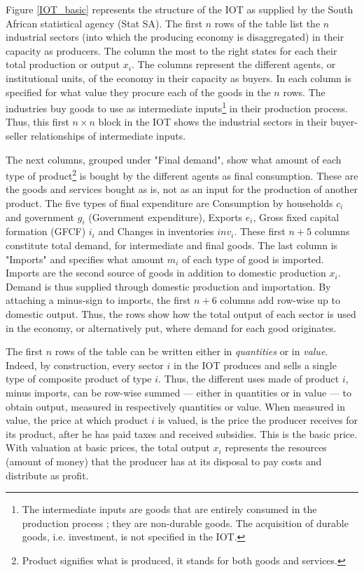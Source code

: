 \documentclass[12pt,english]{article}
\begin{document}
Figure \ref{IOT_basic} represents the structure of the IOT as supplied by the South African statistical agency (Stat SA). The first $n$ rows of the table list the $n$ industrial sectors (into which the producing economy is disaggregated) in their capacity as producers. The column the most to the right states for each their total production or output $x_i$. 
The columns represent the different agents, or institutional units, of the economy in their capacity as buyers. In each column is specified for what value they procure each of the goods in the $n$ rows. %
The industries buy goods to use as intermediate inputs\footnote{The intermediate inputs are goods that are entirely consumed in the production process ; they are non-durable goods. The acquisition of durable goods, i.e. investment, is not specified in the IOT.} in their production process. Thus, this first $n \times n$ block in the IOT shows the industrial sectors in their buyer-seller relationships of intermediate inputs. 

The next columns, grouped under "Final demand", show what amount of each type of product\footnote{Product signifies what is produced, it stands for both goods and services.} is bought by the different agents as final consumption. These are the goods and services bought as is, not as an input for the production of another product. The five types of final expenditure are Consumption by households $c_i$ and government $g_i$ (Government expenditure), Exports $e_i$, Gross fixed capital formation (GFCF) $i_i$ and Changes in inventories $inv_i$. These first $n+5$ columns constitute total demand, for intermediate and final goods. The last column is "Imports" and specifies what amount $m_i$ of each type of good is imported. Imports are the second source of goods in addition to domestic production $x_i$. Demand is thus supplied through domestic production and importation. By attaching a minus-sign to imports, the first $n+6$ columns add row-wise up to domestic output. Thus, the rows show how the total output of each sector is used in the economy, or alternatively put, where demand for each good originates.

The first $n$ rows of the table can be written either in \emph{quantities} or in \emph{value}. Indeed, by construction, every sector $i$ in the IOT produces and sells a single type of composite product of type $i$. Thus, the different uses made of product $i$, minus imports, can be row-wise summed --- either in quantities or in value --- to obtain output, measured in respectively quantities or value. When measured in value, the price at which product $i$ is valued, is the price the producer receives for its product, after he has paid taxes and received subsidies. This is the basic price. %
With valuation at basic prices, the total output $x_i$ represents %
the %
resources (amount of money) that the producer has at its disposal to pay costs and distribute as profit. %
\end{document}
